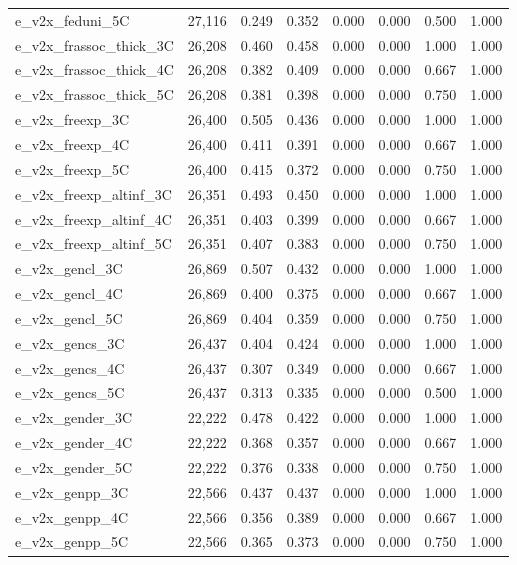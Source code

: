 \begin{table}[!htbp]
\begin{tabular}{@{\extracolsep{5pt}}lccccccc}
e\_v2x\_feduni\_5C & 27,116 & 0.249 & 0.352 & 0.000 & 0.000 & 0.500 & 1.000 \\ 
e\_v2x\_frassoc\_thick\_3C & 26,208 & 0.460 & 0.458 & 0.000 & 0.000 & 1.000 & 1.000 \\ 
e\_v2x\_frassoc\_thick\_4C & 26,208 & 0.382 & 0.409 & 0.000 & 0.000 & 0.667 & 1.000 \\ 
e\_v2x\_frassoc\_thick\_5C & 26,208 & 0.381 & 0.398 & 0.000 & 0.000 & 0.750 & 1.000 \\ 
e\_v2x\_freexp\_3C & 26,400 & 0.505 & 0.436 & 0.000 & 0.000 & 1.000 & 1.000 \\ 
e\_v2x\_freexp\_4C & 26,400 & 0.411 & 0.391 & 0.000 & 0.000 & 0.667 & 1.000 \\ 
e\_v2x\_freexp\_5C & 26,400 & 0.415 & 0.372 & 0.000 & 0.000 & 0.750 & 1.000 \\ 
e\_v2x\_freexp\_altinf\_3C & 26,351 & 0.493 & 0.450 & 0.000 & 0.000 & 1.000 & 1.000 \\ 
e\_v2x\_freexp\_altinf\_4C & 26,351 & 0.403 & 0.399 & 0.000 & 0.000 & 0.667 & 1.000 \\ 
e\_v2x\_freexp\_altinf\_5C & 26,351 & 0.407 & 0.383 & 0.000 & 0.000 & 0.750 & 1.000 \\ 
e\_v2x\_gencl\_3C & 26,869 & 0.507 & 0.432 & 0.000 & 0.000 & 1.000 & 1.000 \\ 
e\_v2x\_gencl\_4C & 26,869 & 0.400 & 0.375 & 0.000 & 0.000 & 0.667 & 1.000 \\ 
e\_v2x\_gencl\_5C & 26,869 & 0.404 & 0.359 & 0.000 & 0.000 & 0.750 & 1.000 \\ 
e\_v2x\_gencs\_3C & 26,437 & 0.404 & 0.424 & 0.000 & 0.000 & 1.000 & 1.000 \\ 
e\_v2x\_gencs\_4C & 26,437 & 0.307 & 0.349 & 0.000 & 0.000 & 0.667 & 1.000 \\ 
e\_v2x\_gencs\_5C & 26,437 & 0.313 & 0.335 & 0.000 & 0.000 & 0.500 & 1.000 \\ 
e\_v2x\_gender\_3C & 22,222 & 0.478 & 0.422 & 0.000 & 0.000 & 1.000 & 1.000 \\ 
e\_v2x\_gender\_4C & 22,222 & 0.368 & 0.357 & 0.000 & 0.000 & 0.667 & 1.000 \\ 
e\_v2x\_gender\_5C & 22,222 & 0.376 & 0.338 & 0.000 & 0.000 & 0.750 & 1.000 \\ 
e\_v2x\_genpp\_3C & 22,566 & 0.437 & 0.437 & 0.000 & 0.000 & 1.000 & 1.000 \\ 
e\_v2x\_genpp\_4C & 22,566 & 0.356 & 0.389 & 0.000 & 0.000 & 0.667 & 1.000 \\ 
e\_v2x\_genpp\_5C & 22,566 & 0.365 & 0.373 & 0.000 & 0.000 & 0.750 & 1.000 \\ 

\end{tabular}
\end{table}
